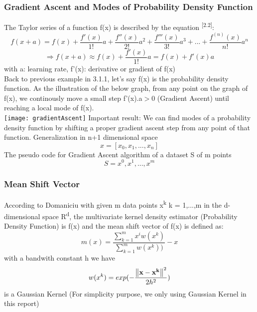 \subsubsection{Gradient Ascent and Modes of Probability Density Function}
The Taylor series of a function f(x) is described by the equation \textsuperscript{[2.2]}:
\[
    f(x+a) = f(x) + \frac{f'(x)}{1!}a+\frac{f''(x)}{2!}a^2+\frac{f'''(x)}{3!}a^3+...+\frac{f^{(n)}(x)}{n!}a^n
\]
\[\Longrightarrow f(x+a) \approx f(x) + \frac{f'(x)}{1!}a =  f(x) + f'(x)a\]
with a: learning rate,  f'(x): derivative or gradient of f(x)\\
Back to previous example in 3.1.1, let's say f(x) is the probability density function. As the illustration of the below graph, from any point on the graph of f(x), we continously move a small step f'(x).a$>$0 (Gradient Ascent) until reaching a local mode of f(x).\\ 
\texttt{[image: gradientAscent]}
Important result: We can find modes of a probability density function by shifting a proper gradient ascent step from any point of that function. Generalization in n+1 dimensional space \[x=[x_0,x_1,...,x_n]\]
The pseudo code for Gradient Ascent algorithm of a dataset S of m points \[S = {x^0,x^1,...,x^m}\]

\subsubsection{Mean Shift Vector}
According to Domaniciu with given m data points x\textsuperscript{k} k = 1,...,m in the d-dimensional space R\textsuperscript{d}, the multivariate kernel density estimator (Probability Density Function) is f(x) and the mean shift vector of f(x) is defined as:
	\[m(x) = \frac{\sum_{k=1}^{m}x^i{w(x^k) }}{\sum_{k=1}^{m}{w(x^k) }) }-x\]
with a bandwith constant h we have \[w(x^k) = exp(-\frac{\norm{\vb{{x-x^k}}}^2}{2{h}^2})\] is a Gaussian Kernel (For simplicity purpose, we only using Gaussian Kernel in this report)
